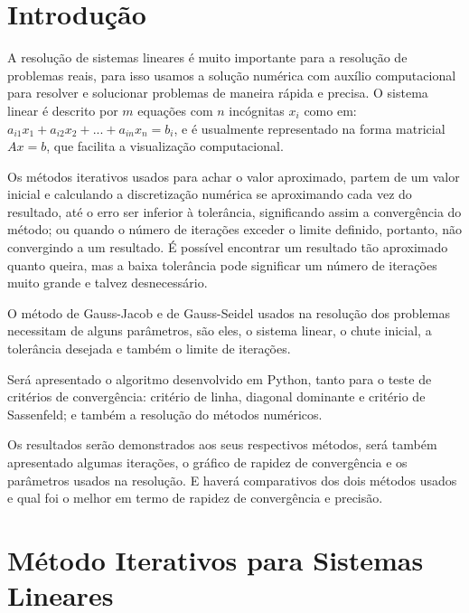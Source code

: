 \documentclass[
12pt,				%
openright,			%
twoside,			%
a4paper,			%
english,			%
french,				%
spanish,			%
brazil				%
]{abntex2_new}
\begin{document}
		\tableofcontents*
		
		
		\textual
		
		
		\chapter*[Introdução]{Introdução}
		A resolução de sistemas lineares é muito importante para a resolução de
		problemas
		reais, para isso usamos a solução numérica com auxílio computacional para
		resolver
		e solucionar problemas de maneira rápida e precisa. O sistema linear é descrito
		por 
		$m$ equações com $n$ incógnitas $x_i$ como em: $a_{i1} x_1 + a_{i2} x_2 + ... +
		a_{in} x_n = b_i$, 
		e é usualmente representado na forma matricial $Ax = b$, que facilita a
		visualização
		computacional.
		
		Os métodos iterativos usados para achar o valor aproximado, partem de um valor
		inicial
		e calculando a discretização numérica se aproximando cada vez do resultado, até
		o erro ser inferior à
		tolerância, significando assim a convergência do método; ou quando o número de iterações
		exceder o limite definido, portanto, não convergindo a um resultado. É possível encontrar
		 um resultado
		tão aproximado quanto
		queira, mas a baixa tolerância pode significar um número de iterações muito
		grande e talvez desnecessário.
		
		O método de Gauss-Jacob e de Gauss-Seidel usados na resolução dos problemas necessitam de alguns
		parâmetros, são eles, 
		o sistema linear, o chute inicial, a tolerância desejada e também o
		limite de iterações.
		
		Será apresentado o algoritmo desenvolvido em Python, tanto para o teste de
		critérios de convergência: 
		critério de linha, diagonal dominante e critério de Sassenfeld; e também a
		resolução do métodos numéricos.
		
		Os resultados serão demonstrados aos seus respectivos métodos, será também apresentado
		algumas iterações,
		o gráfico de rapidez de convergência e os parâmetros usados na resolução. E haverá comparativos
		 dos dois métodos usados e qual foi o melhor em termo de rapidez de
		convergência e precisão.
		
		\chapter{Método Iterativos para Sistemas Lineares}
		
\end{document}
